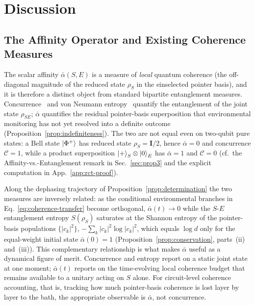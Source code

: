 
\section{Discussion}
\label{sec:disc}

\subsection{The Affinity Operator and Existing Coherence Measures}

The scalar affinity $\bar\alpha(S,E)$ is a measure of \emph{local} quantum coherence (the off-diagonal magnitude of the reduced state $\rho_S$ in the einselected pointer basis), and it is therefore a
distinct object from standard bipartite entanglement measures.
Concurrence~\cite{Wootters1998} and von Neumann
entropy~\cite{vonNeumann1932} quantify the entanglement of the joint
state $\rho_{SE}$; $\bar\alpha$ quantifies the residual pointer-basis
superposition that environmental monitoring has not yet resolved into a
definite outcome (Proposition~\ref{prop:indefiniteness}).
The two are not equal even on two-qubit pure states: a Bell state
$\ket{\Phi^+}$ has reduced state $\rho_S = \mathbf{I}/2$, hence
$\bar\alpha = 0$ and concurrence $\mathcal{C} = 1$, while a product
superposition $\ket{+}_S\otimes\ket{0}_E$ has $\bar\alpha = 1$ and
$\mathcal{C} = 0$ (cf.\ the Affinity-vs.-Entanglement remark in
Sec.~\ref{sec:prop3} and the explicit computation in
App.~\ref{app:rct-proof}).

Along the dephasing trajectory of Proposition~\ref{prop:determination}
the two measures are inversely related: as the conditional environmental
branches in Eq.~\eqref{eq:coherence-transfer} become orthogonal,
$\bar\alpha(t) \to 0$ while the $S$-$E$ entanglement entropy $S(\rho_S)$
saturates at the Shannon entropy of the pointer-basis populations
$\{\lvert c_k\rvert^2\}$,
$-\sum_k \lvert c_k\rvert^2 \log \lvert c_k\rvert^2$, which equals
$\log d$ only for the equal-weight initial state $\bar\alpha(0) = 1$
(Proposition~\ref{prop:conservation}, parts~(ii) and~(iii)).
This complementary relationship is what makes $\bar\alpha$ useful as a
dynamical figure of merit.
Concurrence and entropy report on a static joint state at one moment;
$\bar\alpha(t)$ reports on the time-evolving local coherence budget that
remains available to a unitary acting on $S$ alone.
For circuit-level coherence accounting, that is, tracking how much pointer-basis coherence is lost layer by layer to the bath, the appropriate observable is $\bar\alpha$, not
concurrence.

